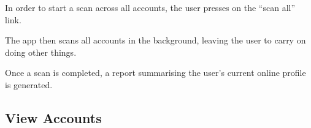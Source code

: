 \begin{minipage}{\textwidth}
  \centering
  \begin{minipage}[t]{4.6cm}
    \vspace{0pt}
    \centering
    \begin{minipage}{4.4cm}
      In order to start a scan across all accounts, the user presses on the ``scan all'' link.
    \end{minipage}
  \end{minipage}
  \begin{minipage}[t]{4.6cm}
    \vspace{0pt}
    \centering
    \begin{minipage}{4.4cm}
      The app then scans all accounts in the background, leaving the user to carry on doing other things.
    \end{minipage}
  \end{minipage}
  \begin{minipage}[t]{4.6cm}
    \vspace{0pt}
    \centering
    \begin{minipage}{4.4cm}
      Once a scan is completed, a report summarising the user's current online profile is generated.
    \end{minipage}
  \end{minipage}
\end{minipage}

\clearpage

\subsection{View Accounts}

